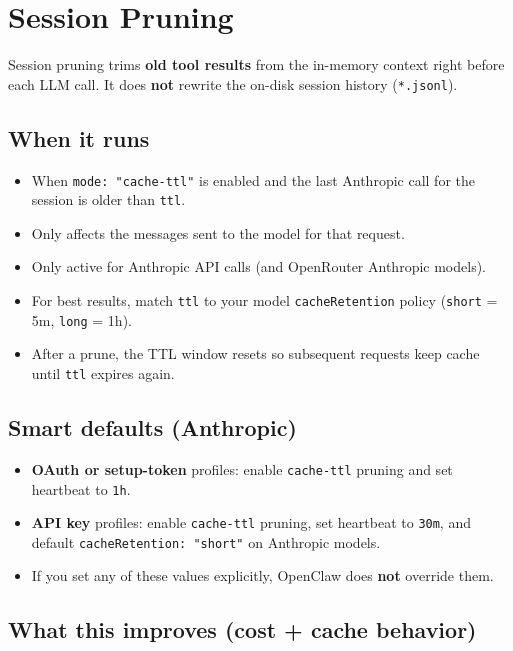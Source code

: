 \clearpage

\section{Session Pruning}


Session pruning trims \textbf{old tool results} from the in-memory context right before each LLM call. It does \textbf{not} rewrite the on-disk session history (\texttt{*.jsonl}).

\subsection{When it runs}


\begin{itemize}
  \item When \texttt{mode: "cache-ttl"} is enabled and the last Anthropic call for the session is older than \texttt{ttl}.
  \item Only affects the messages sent to the model for that request.
  \item Only active for Anthropic API calls (and OpenRouter Anthropic models).
  \item For best results, match \texttt{ttl} to your model \texttt{cacheRetention} policy (\texttt{short} = 5m, \texttt{long} = 1h).
  \item After a prune, the TTL window resets so subsequent requests keep cache until \texttt{ttl} expires again.
\end{itemize}


\subsection{Smart defaults (Anthropic)}


\begin{itemize}
  \item \textbf{OAuth or setup-token} profiles: enable \texttt{cache-ttl} pruning and set heartbeat to \texttt{1h}.
  \item \textbf{API key} profiles: enable \texttt{cache-ttl} pruning, set heartbeat to \texttt{30m}, and default \texttt{cacheRetention: "short"} on Anthropic models.
  \item If you set any of these values explicitly, OpenClaw does \textbf{not} override them.
\end{itemize}


\subsection{What this improves (cost + cache behavior)}



